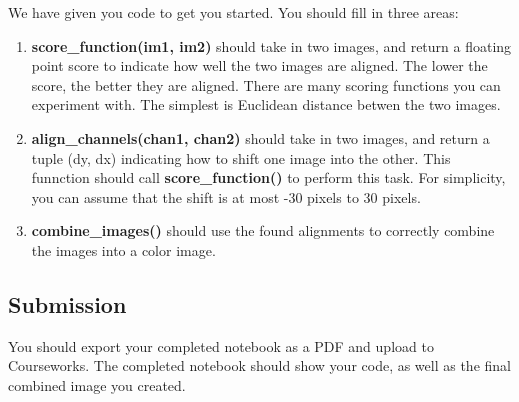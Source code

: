 \documentclass[11pt]{article}
\begin{document}
We have given you code to get you started. You should fill in three
areas:

\begin{enumerate}
\def\labelenumi{\arabic{enumi}.}
\item
  \textbf{score\_function(im1, im2)} should take in two images, and
  return a floating point score to indicate how well the two images are
  aligned. The lower the score, the better they are aligned. There are
  many scoring functions you can experiment with. The simplest is
  Euclidean distance betwen the two images.
\item
  \textbf{align\_channels(chan1, chan2)} should take in two images, and
  return a tuple (dy, dx) indicating how to shift one image into the
  other. This funnction should call \textbf{score\_function()} to
  perform this task. For simplicity, you can assume that the shift is at
  most -30 pixels to 30 pixels.
\item
  \textbf{combine\_images()} should use the found alignments to
  correctly combine the images into a color image.
\end{enumerate}

\subsection{Submission}\label{submission}

You should export your completed notebook as a PDF and upload to
Courseworks. The completed notebook should show your code, as well as
the final combined image you created.
\end{document}
